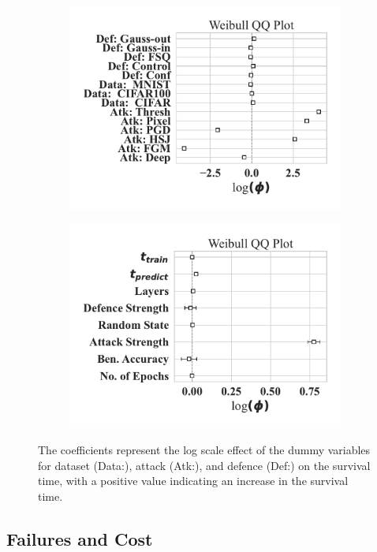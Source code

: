 \begin{figure}
    \centering
	\begin{subfigure}
	\centering
    \includegraphics[width=.40\textwidth]{plots/weibull_aft_dummies.pdf}
    \end{subfigure}
    \begin{subfigure}
	\centering
    \includegraphics[width=.40\textwidth]{plots/weibull_aft.pdf}
    \label{fig:dummies}
    \end{subfigure}
    \caption{The coefficients represent the log scale effect of the dummy variables for dataset (Data:), attack (Atk:), and defence (Def:) on the survival time, with a positive value indicating an increase in the survival time.}
    \label{fig:covariates}
\end{figure}

\subsection{Failures and Cost}


